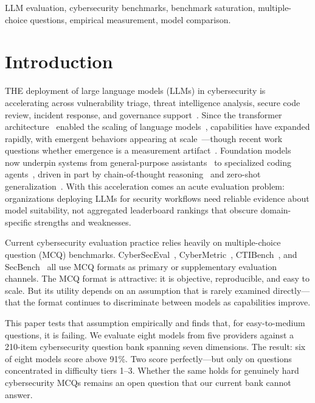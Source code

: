 \documentclass[journal]{IEEEtran}
\begin{document}
\begin{IEEEkeywords}
LLM evaluation, cybersecurity benchmarks, benchmark saturation, multiple-choice questions, empirical measurement, model comparison.
\end{IEEEkeywords}

\section{Introduction}

THE deployment of large language models (LLMs) in cybersecurity is accelerating across vulnerability triage, threat intelligence analysis, secure code review, incident response, and governance support~\cite{zhang2024llmcyber}. Since the transformer architecture~\cite{vaswani2017attention} enabled the scaling of language models~\cite{brown2020language,kaplan2020scaling,hoffmann2022training}, capabilities have expanded rapidly, with emergent behaviors appearing at scale~\cite{wei2022emergent}---though recent work questions whether emergence is a measurement artifact~\cite{schaeffer2024emergent}. Foundation models~\cite{bommasani2021opportunities} now underpin systems from general-purpose assistants~\cite{openai2023gpt4,geminiteam2023,deepseek2024} to specialized coding agents~\cite{nijkamp2023codegen,roziere2023code}, driven in part by chain-of-thought reasoning~\cite{wei2022chain} and zero-shot generalization~\cite{kojima2022zero}. With this acceleration comes an acute evaluation problem: organizations deploying LLMs for security workflows need reliable evidence about model suitability, not aggregated leaderboard rankings that obscure domain-specific strengths and weaknesses.

Current cybersecurity evaluation practice relies heavily on multiple-choice question (MCQ) benchmarks. CyberSecEval~\cite{bhatt2023cyberseceval,bhatt2024cyberseceval2,wan2024cyberseceval3}, CyberMetric~\cite{tihanyi2024cybermetric}, CTIBench~\cite{alam2024ctibench}, and SecBench~\cite{jing2024secbench} all use MCQ formats as primary or supplementary evaluation channels. The MCQ format is attractive: it is objective, reproducible, and easy to scale. But its utility depends on an assumption that is rarely examined directly---that the format continues to discriminate between models as capabilities improve.

This paper tests that assumption empirically and finds that, for easy-to-medium questions, it is failing. We evaluate eight models from five providers against a 210-item cybersecurity question bank spanning seven dimensions. The result: six of eight models score above 91\%. Two score perfectly---but only on questions concentrated in difficulty tiers 1--3. Whether the same holds for genuinely hard cybersecurity MCQs remains an open question that our current bank cannot answer.
\end{document}
